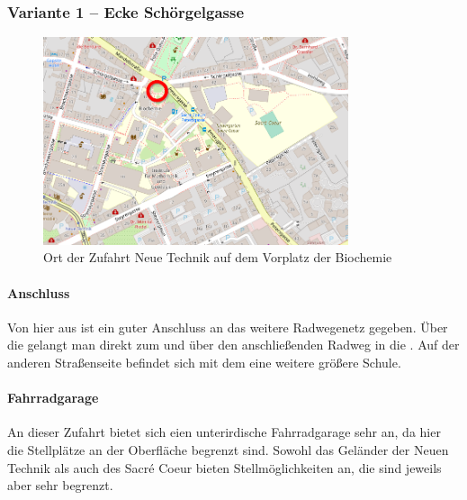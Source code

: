 \subsubsection{Variante 1 -- Ecke Schörgelgasse}

\begin{figure}
    \centering
    \includegraphics[width=0.8\textwidth]{main/bike/tunnel/uni/zufahrt_neue_technik}
    \caption[Zufahrt Neue Technik]{Ort der Zufahrt Neue Technik auf dem Vorplatz der Biochemie}
\end{figure}

\paragraph{Anschluss}
Von hier aus ist ein guter Anschluss an das weitere Radwegenetz gegeben. Über die  gelangt man direkt zum  und über den anschließenden Radweg in die . Auf der anderen Straßenseite befindet sich mit dem  eine weitere größere Schule.

\paragraph{Fahrradgarage}
An dieser Zufahrt bietet sich eien unterirdische Fahrradgarage sehr an, da hier die Stellplätze an der Oberfläche begrenzt sind. Sowohl das Geländer der Neuen Technik als auch des Sacré Coeur bieten Stellmöglichkeiten an, die sind jeweils aber sehr begrenzt.

